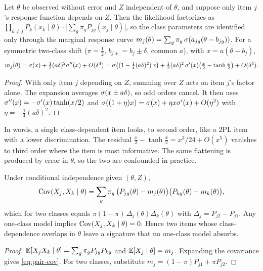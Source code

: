 \begin{proposition}\label{prop:single}\proved{}
Let $\theta$ be observed without error and $Z$ independent of $\theta$, and suppose only item
$j$'s response function depends on $Z$. Then the likelihood factorizes as
$\prod_{k\neq j}P_k(x_k\mid\theta)\cdot\bigl[\sum_g\pi_gP_{jg}(x_j\mid\theta)\bigr]$, so the
class parameters are identified only through the marginal response curve
$m_j(\theta)=\sum_g\pi_g\,\sigma(a_{jg}(\theta-b_{jg}))$. For a symmetric two-class shift
($\pi=\tfrac12$, $b_{j\pm}=b_j\pm\delta$, common $a$), with $x=a(\theta-b_j)$,
\begin{equation}\label{eq:single-expansion}
  m_j(\theta)=\sigma(x)+\tfrac12(a\delta)^2\sigma''(x)+O(\delta^4)
  =\sigma\bigl((1-\tfrac14(a\delta)^2)\,x\bigr)
   +\tfrac12(a\delta)^2\,\sigma'(x)\bigl(\tfrac{x}{2}-\tanh\tfrac{x}{2}\bigr)+O(\delta^4).
\end{equation}
\end{proposition}
\begin{proof}
With only item $j$ depending on $Z$, summing over $Z$ acts on item $j$'s factor alone. The
expansion averages $\sigma(x\pm a\delta)$, so odd orders cancel. It then uses
$\sigma''(x)=-\sigma'(x)\tanh(x/2)$ and $\sigma((1+\eta)x)=\sigma(x)+\eta x\sigma'(x)+O(\eta^2)$ with
$\eta=-\tfrac14(a\delta)^2$.
\end{proof}

In words, a single class-dependent item looks, to second order, like a 2PL item with a lower
discrimination. The residual $\tfrac{x}{2}-\tanh\tfrac{x}{2}=x^3/24+O(x^5)$ vanishes to third
order where the item is most informative. The same flattening is produced by error in
$\theta$, so the two are confounded in practice.

\begin{proposition}\label{prop:pair}\proved{}
Under conditional independence given $(\theta,Z)$,
\begin{equation}\label{eq:pair-cov}
  \operatorname{Cov}(X_j,X_k\mid\theta)=\sum_g\pi_g\,\bigl(P_{jg}(\theta)-m_j(\theta)\bigr)\bigl(P_{kg}(\theta)-m_k(\theta)\bigr),
\end{equation}
which for two classes equals $\pi(1-\pi)\,\Delta_j(\theta)\Delta_k(\theta)$ with
$\Delta_j=P_{j2}-P_{j1}$. Any one-class model implies $\operatorname{Cov}(X_j,X_k\mid\theta)=0$. Hence two items
whose class-dependence overlaps in $\theta$ leave a signature that no one-class model absorbs.
\end{proposition}
\begin{proof}
$\mathbb{E}[X_jX_k\mid\theta]=\sum_g\pi_gP_{jg}P_{kg}$ and $\mathbb{E}[X_j\mid\theta]=m_j$. Expanding the
covariance gives \eqref{eq:pair-cov}. For two classes, substitute $m_j=(1-\pi)P_{j1}+\pi P_{j2}$.
\end{proof}

